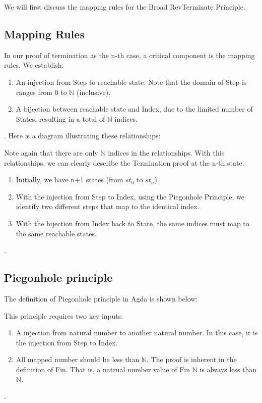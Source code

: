 We will first discuss the mapping rules for the Broad RevTerminate Principle.

\subsection{ Mapping Rules }
In our proof of termination as the n-th case, a critical component is the mapping rules.
We establish:
\begin{enumerate}[1.]
    \item An injection from Step to reachable state.  Note that the domain of Step is ranges from 0 to $\mathbb{N}$ (inclusive).
    \item A bijection between reachable state and Index, due to the limited number of States, resulting in a total of $\mathbb{N}$ indices.
\end{enumerate}.
Here is a diagram illustrating these relationships:


Note again that there are only $\mathbb{N}$ indices in the relationships.
With this relationships, we can clearly describe the Termination proof at the n-th state:
\begin{enumerate}[1.]
    \item Initially, we have n+1 states (from $st_{0}$ to $st_{n}$).
    \item With the injection from Step to Index, using the Piegonhole Principle, we identify two different steps that map to the identical index.
    \item With the bijection from Index back to State, the same indices must map to the same reachable states.
\end{enumerate}.

\subsection{ Piegonhole principle }
The definition of Piegonhole principle in Agda is shown below:



This principle requires two key inputs:
\begin{enumerate}[1.]
    \item A injection from natural number to another natural number. In this case, it is the injection from Step to Index. 
    \item All mapped number should be less than $\mathbb{N}$.  The proof is inherent in the definition of Fin.  That is, a natrual number value of Fin $\mathbb{N}$ is always less than $\mathbb{N}$.
\end{enumerate}.


